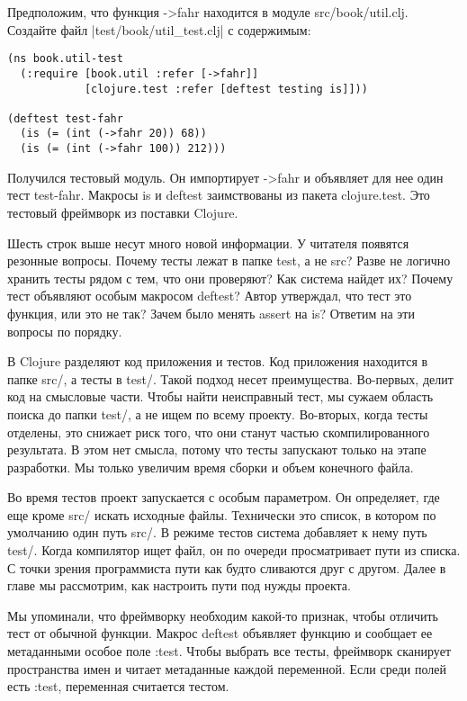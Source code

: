Предположим, что функция ->fahr находится в модуле src/book/util.clj. Создайте
файл \spverb|test/book/util_test.clj| с содержимым:

\begin{verbatim}
(ns book.util-test
  (:require [book.util :refer [->fahr]]
            [clojure.test :refer [deftest testing is]]))

(deftest test-fahr
  (is (= (int (->fahr 20)) 68))
  (is (= (int (->fahr 100)) 212)))
\end{verbatim}

Получился тестовый модуль. Он импортирует ->fahr и объявляет для нее один тест
test-fahr. Макросы is и deftest заимствованы из пакета clojure.test. Это
тестовый фреймворк из поставки Clojure.

Шесть строк выше несут много новой информации. У читателя появятся резонные
вопросы. Почему тесты лежат в папке test, а не src? Разве не логично хранить
тесты рядом с тем, что они проверяют? Как система найдет их? Почему тест
объявляют особым макросом deftest? Автор утверждал, что тест это функция, или
это не так? Зачем было менять assert на is? Ответим на эти вопросы по порядку.

В Clojure разделяют код приложения и тестов. Код приложения находится в папке
src/, а тесты в test/. Такой подход несет преимущества. Во-первых, делит код на
смысловые части. Чтобы найти неисправный тест, мы сужаем область поиска до папки
test/, а не ищем по всему проекту. Во-вторых, когда тесты отделены, это снижает
риск того, что они станут частью скомпилированного результата. В этом нет
смысла, потому что тесты запускают только на этапе разработки. Мы только
увеличим время сборки и объем конечного файла.

Во время тестов проект запускается с особым параметром. Он определяет, где еще
кроме src/ искать исходные файлы. Технически это список, в котором по умолчанию
один путь src/. В режиме тестов система добавляет к нему путь test/. Когда
компилятор ищет файл, он по очереди просматривает пути из списка. С точки зрения
программиста пути как будто сливаются друг с другом. Далее в главе мы
рассмотрим, как настроить пути под нужды проекта.

Мы упоминали, что фреймворку необходим какой-то признак, чтобы отличить тест от
обычной функции. Макрос deftest объявляет функцию и сообщает ее метаданными
особое поле :test. Чтобы выбрать все тесты, фреймворк сканирует пространства
имен и читает метаданные каждой переменной. Если среди полей есть :test,
переменная считается тестом.

